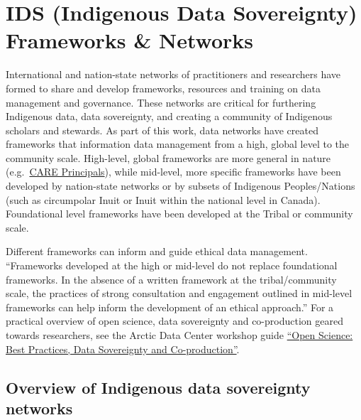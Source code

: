 \documentclass[
]{book}
\begin{document}
\hypertarget{ids-indigenous-data-sovereignty-frameworks-networks}{%
\chapter{IDS (Indigenous Data Sovereignty) Frameworks \& Networks}\label{ids-indigenous-data-sovereignty-frameworks-networks}}

International and nation-state networks of practitioners and researchers have formed to share and develop frameworks, resources and training on data management and governance. These networks are critical for furthering Indigenous data, data sovereignty, and creating a community of Indigenous scholars and stewards. As part of this work, data networks have created frameworks that information data management from a high, global level to the community scale. High-level, global frameworks are more general in nature (e.g.~\href{https://static1.squarespace.com/static/5d3799de845604000199cd24/t/5da9f4479ecab221ce848fb2/1571419335217/CARE+Principles_One+Pagers+FINAL_Oct_17_2019.pdf}{CARE Principals}), while mid-level, more specific frameworks have been developed by nation-state networks or by subsets of Indigenous Peoples/Nations (such as circumpolar Inuit or Inuit within the national level in Canada). Foundational level frameworks have been developed at the Tribal or community scale.

Different frameworks can inform and guide ethical data management. ``Frameworks developed at the high or mid-level do not replace foundational frameworks. In the absence of a written framework at the tribal/community scale, the practices of strong consultation and engagement outlined in mid-level frameworks can help inform the development of an ethical approach.'' For a practical overview of open science, data sovereignty and co-production geared towards researchers, see the Arctic Data Center workshop guide \href{https://learning.nceas.ucsb.edu/2022-03-assw/index.html}{``Open Science: Best Practices, Data Sovereignty and Co-production''}.

\hypertarget{overview-of-indigenous-data-sovereignty-networks}{%
\section*{Overview of Indigenous data sovereignty networks}\label{overview-of-indigenous-data-sovereignty-networks}}
\end{document}
